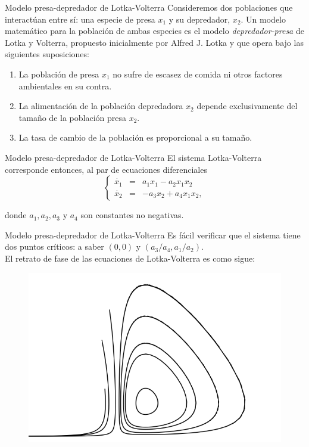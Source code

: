 \documentclass{beamer}
\begin{document}
\begin{frame}{Modelo presa-depredador de Lotka-Volterra}
Consideremos dos poblaciones que interactúan entre sí: una especie de presa $x_1$ y su depredador, $x_2$. Un modelo matemático para la población de ambas especies es el modelo \emph{depredador-presa} de Lotka y Volterra, propuesto inicialmente por Alfred J. Lotka y que opera bajo las siguientes suposiciones:

\begin{enumerate}
	\item La población de presa $x_1$ no sufre de escasez de comida ni otros factores ambientales en su contra.
	\item La alimentación de la población depredadora $x_2$ depende exclusivamente del tamaño de la población presa $x_2$.
	\item La tasa de cambio de la población es proporcional a su tamaño.
\end{enumerate}
\end{frame}

\begin{frame}{Modelo presa-depredador de Lotka-Volterra}
El sistema Lotka-Volterra corresponde entonces, al par de ecuaciones diferenciales
$$
\left\{
	\begin{array}{lll}
		\dot{x_1} & = & a_1x_1 - a_2x_1x_2 \\
		\dot{x_2} & = & -a_3x_2 + a_4x_1x_2,
	\end{array} \right.
$$

donde $a_1, a_2, a_3$ y $a_4$ son constantes no negativas.
\end{frame}

\begin{frame}{Modelo presa-depredador de Lotka-Volterra}
Es fácil verificar que el sistema tiene dos puntos críticos: a saber $(0,0)$ y $(a_3 / a_4, a_1 / a_2)$.\\
\pause
El retrato de fase de las ecuaciones de Lotka-Volterra es como sigue:

\begin{figure}[!ht] \centering
	\includegraphics[scale=0.35]{../figures/lotkavolterra.png}
\end{figure}

\end{frame}
\end{document}
